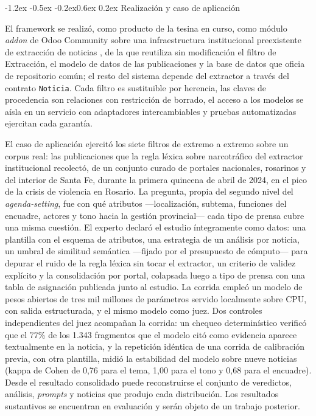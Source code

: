 \documentclass[12pt,a4paper,twocolumn]{article}
\makeatletter
\renewcommand\section{\@startsection{section}{1}{\z@}%
  {-1.2ex \@plus -0.5ex \@minus -0.2ex}{0.6ex \@plus 0.2ex}%
  {\normalfont\normalsize\bfseries}}
\makeatother
\begin{document}
\section{Realización y caso de aplicación}

El framework se realizó, como producto de la tesina en curso, como módulo \textit{addon} de Odoo Community sobre una infraestructura institucional preexistente de extracción de noticias \cite{raimondo:2024}, de la que reutiliza sin modificación el filtro de Extracción, el modelo de datos de las publicaciones y la base de datos que oficia de repositorio común; el resto del sistema depende del extractor a través del contrato \texttt{Noticia}. Cada filtro es sustituible por herencia, las claves de procedencia son relaciones con restricción de borrado, el acceso a los modelos se aísla en un servicio con adaptadores intercambiables y pruebas automatizadas ejercitan cada garantía.

El caso de aplicación ejercitó los siete filtros de extremo a extremo sobre un corpus real: las publicaciones que la regla léxica sobre narcotráfico del extractor institucional recolectó, de un conjunto curado de portales nacionales, rosarinos y del interior de Santa Fe, durante la primera quincena de abril de 2024, en el pico de la crisis de violencia en Rosario. La pregunta, propia del segundo nivel del \textit{agenda-setting}, fue con qué atributos ---localización, subtema, funciones del encuadre, actores y tono hacia la gestión provincial--- cada tipo de prensa cubre una misma cuestión. El experto declaró el estudio íntegramente como datos: una plantilla con el esquema de atributos, una estrategia de un análisis por noticia, un umbral de similitud semántica ---fijado por el presupuesto de cómputo--- para depurar el ruido de la regla léxica sin tocar el extractor, un criterio de validez explícito y la consolidación por portal, colapsada luego a tipo de prensa con una tabla de asignación publicada junto al estudio. La corrida empleó un modelo de pesos abiertos de tres mil millones de parámetros servido localmente sobre CPU, con salida estructurada, y el mismo modelo como juez. Dos controles independientes del juez acompañan la corrida: un chequeo determinístico verificó que el 77\% de los 1.343 fragmentos que el modelo citó como evidencia aparece textualmente en la noticia, y la repetición idéntica de una corrida de calibración previa, con otra plantilla, midió la estabilidad del modelo sobre nueve noticias (kappa de Cohen de 0,76 para el tema, 1,00 para el tono y 0,68 para el encuadre). Desde el resultado consolidado puede reconstruirse el conjunto de veredictos, análisis, \textit{prompts} y noticias que produjo cada distribución. Los resultados sustantivos se encuentran en evaluación y serán objeto de un trabajo posterior.
\end{document}
